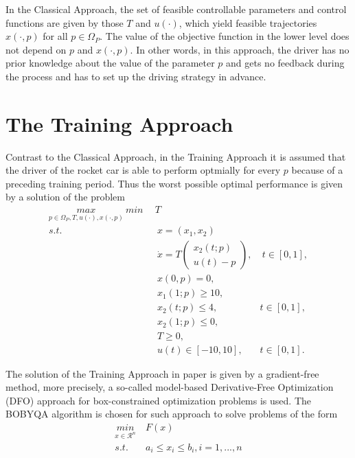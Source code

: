 	In the Classical Approach, the set of feasible controllable parameters and control functions are given by those $T$ and $u(\cdot)$, which yield feasible trajectories $x(\cdot, p)$ for all $p \in \Omega_P$. The value of the objective function in the lower level does not depend on $p$ and $x(\cdot, p)$. In other words, in this approach, the driver has no prior knowledge about the value of the parameter $p$ and gets no feedback during the process and has to set up the driving strategy in advance. 
	
	\section{The Training Approach}
	Contrast to the Classical Approach, in the Training Approach it is assumed that the driver of the rocket car is able to perform optmially for every $p$ because of a preceding training period. Thus the worst possible optimal performance is given by a solution of the problem
	\begin{subequations}
		\begin{align}
			\underset{p \in \Omega_P, T, u(\cdot), x(\cdot,p)}{max}  \ 	\underset{}{min} \   & \  T \\ 
			s.t.  & \ \ x = (x_1, x_2)   \label{ta_rc_x} \\ 
			& \ \  \dot{x} = T  \begin{pmatrix}  x_2(t;p) \\ u(t)-p   \end{pmatrix}, & \ t \in [0,1],  \label{ta_rc_partial} \\
			& \ \ x(0,p) = 0, \label{ta_rc_t0}\\
			& \ \ x_1(1;p) \geq 10, \label{ta_rc_x1_t1} \\
			& \ \ x_2(t;p) \leq 4, & t \in [0,1], \label{ta_rc_x2_tc} \\
			& \ \ x_2(1;p) \leq 0, \label{ta_rc_x2_t1}  \\
			& \ \ T \geq 0, \\
			& \ \ u(t) \in [-10, 10], & t \in [0,1]. 
		\end{align}
		\label{TA_rc}
	\end{subequations}
	
	The solution of the Training Approach in paper \cite{MatSch22} is given by a gradient-free method, more precisely, a so-called model-based Derivative-Free Optimization (DFO) approach for box-constrained optimization problems is used. The BOBYQA algorithm is chosen for such approach to solve problems of the form
	\begin{equation}
		\begin{aligned}
			\underset{x \in \mathcal{R}^n}{min} & \  F(x)  \\ 
			s.t.  & \ a_i \leq x_i \leq b_i, i = 1, ..., n \\
		\end{aligned}
		\label{DFO_bc}
	\end{equation}
	
